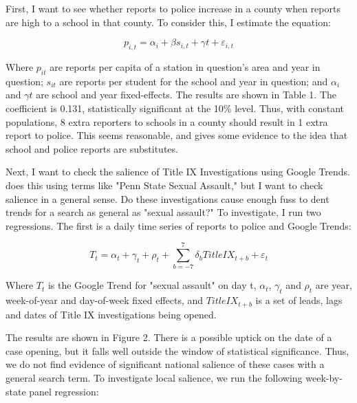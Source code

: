 \documentclass[AER,draftmode]{AEA}
\begin{document}
First, I want to see whether reports to police increase in a county when reports are high to a school in that county. To consider this, I estimate the equation: 

$$ 
p_{i,t} = \alpha_{i} + \beta s_{i,t} + \gamma{t} + \varepsilon_{i,t}
$$ 

Where $p_{it}$ are reports per capita of a station in question's area and year in question; $s_{it}$ are reports per student for the school and year in question; and $\alpha_{i}$ and $\gamma{t}$ are school and year fixed-effects. The results are shown in Table 1. The coefficient is 0.131, statistically significant at the 10\% level. Thus, with constant populations, 8 extra reporters to schools in a county should result in 1 extra report to police.  This seems reasonable, and gives some evidence to the idea that school and police reports are substitutes. 

Next, I want to check the salience of Title IX Investigations using Google Trends.  does this using terms like "Penn State Sexual Assault," but I want to check salience in a general sense. Do these investigations cause enough fuss to dent trends for a search as general as "sexual assault?" To investigate, I run two regressions. The first is a daily time series of reports to police and Google Trends:

$$
T_{t} = \alpha_{t} + \gamma_{t} + \rho_{t} + \sum_{b=-7}^{7} \delta_{b} TitleIX_{t+b} + \varepsilon_{t}
$$

Where $T_{t}$ is the Google Trend for "sexual assault" on day t, $\alpha_{t}$, $\gamma_{t}$ and $\rho_{t}$ are year, week-of-year and day-of-week fixed effects, and $TitleIX_{t+b}$ is a set of leads, lags and dates of Title IX investigations being opened. 

The results are shown in Figure 2. There is a possible uptick on the date of a case opening, but it falls well outside the window of statistical significance. Thus, we do not find evidence of significant national salience of these cases with a general search term. To investigate local salience, we run the following week-by-state panel regression: 
\end{document}
